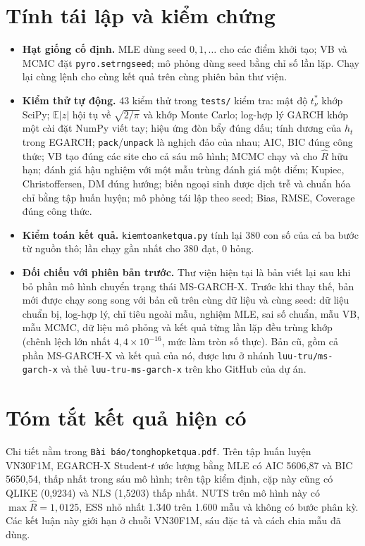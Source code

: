 \documentclass[11pt,a4paper]{article}
\renewcommand{\_}{\gachduoi\allowbreak}
\newcommand{\tep}[1]{\texttt{#1}}
\newcommand{\ham}[1]{\texttt{#1}}
\newcommand{\E}{\mathbb{E}}
\begin{document}
\section{Tính tái lập và kiểm chứng}
\begin{itemize}
\item \textbf{Hạt giống cố định.} MLE dùng seed $0,1,\dots$ cho các điểm khởi tạo; VB và MCMC đặt \ham{pyro.set\_rng\_seed}; mô phỏng dùng seed bằng chỉ số lần lặp. Chạy lại cùng lệnh cho cùng kết quả trên cùng phiên bản thư viện.
\item \textbf{Kiểm thử tự động.} 43 kiểm thử trong \tep{tests/} kiểm tra: mật độ $t^*_\nu$ khớp SciPy; $\E|z|$ hội tụ về $\sqrt{2/\pi}$ và khớp Monte Carlo; log-hợp lý GARCH khớp một cài đặt NumPy viết tay; hiệu ứng đòn bẩy đúng dấu; tính dương của $h_t$ trong EGARCH; \ham{pack}/\ham{unpack} là nghịch đảo của nhau; AIC, BIC đúng công thức; VB tạo đúng các site cho cả sáu mô hình; MCMC chạy và cho $\hat R$ hữu hạn; đánh giá hậu nghiệm với một mẫu trùng đánh giá một điểm; Kupiec, Christoffersen, DM đúng hướng; biến ngoại sinh được dịch trễ và chuẩn hóa chỉ bằng tập huấn luyện; mô phỏng tái lập theo seed; Bias, RMSE, Coverage đúng công thức.
\item \textbf{Kiểm toán kết quả.} \tep{kiem\_toan\_ket\_qua.py} tính lại 380 con số của cả ba bước từ nguồn thô; lần chạy gần nhất cho 380 đạt, 0 hỏng.
\item \textbf{Đối chiếu với phiên bản trước.} Thư viện hiện tại là bản viết lại sau khi bỏ phần mô hình chuyển trạng thái MS-GARCH-X. Trước khi thay thế, bản mới được chạy song song với bản cũ trên cùng dữ liệu và cùng seed: dữ liệu chuẩn bị, log-hợp lý, chỉ tiêu ngoài mẫu, nghiệm MLE, sai số chuẩn, mẫu VB, mẫu MCMC, dữ liệu mô phỏng và kết quả từng lần lặp đều trùng khớp (chênh lệch lớn nhất $4{,}4\times10^{-16}$, mức làm tròn số thực). Bản cũ, gồm cả phần MS-GARCH-X và kết quả của nó, được lưu ở nhánh \tep{luu-tru/ms-garch-x} và thẻ \tep{luu-tru-ms-garch-x} trên kho GitHub của dự án.
\end{itemize}

\section{Tóm tắt kết quả hiện có}
Chi tiết nằm trong \tep{Bài báo/tong\_hop\_ket\_qua.pdf}. Trên tập huấn luyện VN30F1M, EGARCH-X Student-$t$ ước lượng bằng MLE có AIC 5606,87 và BIC 5650,54, thấp nhất trong sáu mô hình; trên tập kiểm định, cặp này cũng có QLIKE (0,9234) và NLS (1,5203) thấp nhất. NUTS trên mô hình này có $\max\hat R=1{,}0125$, ESS nhỏ nhất 1.340 trên 1.600 mẫu và không có bước phân kỳ. Các kết luận này giới hạn ở chuỗi VN30F1M, sáu đặc tả và cách chia mẫu đã dùng.
\end{document}
